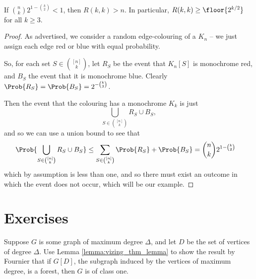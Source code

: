 \documentclass[nobib]{tufte-handout}
\begin{document}
\begin{theorem}[Erd\H{o}s, 1947]
  If $\binom{n}{k}2^{1 - \binom{k}{2}} < 1$, then $R(k,k) > n$. In particular, $R(k,k) \geq \floor{2^{k/2}}$ for all $k \geq 3$.

  \begin{proof}
    As advertised, we consider a random edge-colouring of a $K_n$ -- we just assign each edge red or blue with equal probability.

    So, for each set $S \in \binom{[n]}{k}$, let $R_S$ be the event that $K_n[S]$ is monochrome red, and $B_S$ the event that it is monochrome blue. Clearly $\Prob{R_S} = \Prob{B_S} = 2^{-\binom{k}{2}}$.
    
    Then the event that the colouring has a monochrome $K_k$ is just
    $$\bigcup_{S \in \binom{[n]}{k}} R_S \cup B_S,$$
    and so we can use a union bound to see that
    \begin{align*}
      \Prob{\bigcup_{S \in \binom{[n]}{k}} R_S \cup B_S} &\leq \sum_{S \in \binom{[n]}{k}} \Prob{R_S} + \Prob{B_S} = \binom{n}{k}2^{1 - \binom{k}{2}}
    \end{align*}
    which by assumption is less than one, and so there must exist an outcome in which the event does not occur, which will be our example.
  \end{proof}
\end{theorem}

\section{Exercises}

\begin{xca}
  Suppose $G$ is some graph of maximum degree $\Delta$, and let $D$ be the set of vertices of degree $\Delta$. Use Lemma \ref{lemma:vizing_thm_lemma} to show the result by Fournier that if $G[D]$, the subgraph induced by the vertices of maximum degree, is a forest, then $G$ is of class one.
\end{xca}

%
%
\end{document}
